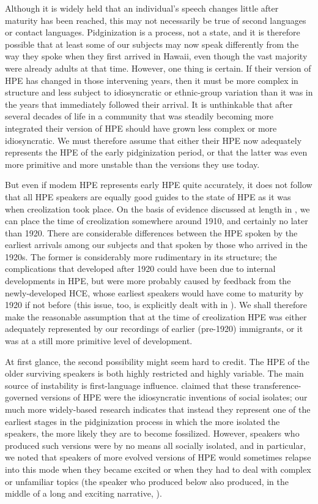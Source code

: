 Although it is widely held that an individual's speech changes little after maturity has been reached, this may not necessarily be true of second languages or contact languages. Pidginization is a process, not a state, and it is therefore possible that at least some of our subjects may now speak differently from the way they spoke when they first arrived in Hawaii, even though the vast majority were already adults at that time. However, one thing is certain. If their version of HPE has changed in those intervening years, then it must be more complex in structure and less subject to idiosyncratic or ethnic-group variation than it was in the years that immediately followed their arrival. It is unthinkable that after several decades of life in a community that was steadily becoming more integrated their version of HPE should have grown less complex or more idiosyncratic. We must therefore assume that either their HPE now adequately represents the HPE of the early pidginization period, or that the latter was even more primitive and more unstable than the versions they use today.

But even if modem HPE represents early HPE quite accurately, it does not follow that all HPE speakers are equally good guides to the state of HPE as it was when creolization took place. On the basis of evidence discussed at length in \citet{Bickerton1977}, we can place the time of creolization somewhere around 1910, and certainly no later than 1920. There are considerable differences between the HPE spoken by
the earliest arrivals among our subjects and that spoken by those who arrived in the 1920s. The former is considerably more rudimentary in its structure; the complications that developed after 1920 could have been due to internal developments in HPE, but were more probably caused by feedback from the newly-developed HCE, whose earliest speakers would have come to maturity by 1920 if not before (this issue, too, is explicitly dealt with in \citealt[Chapter~4]{Bickerton1977}). We shall therefore make the reasonable assumption that at the time of creolization HPE was either adequately represented by our recordings of earlier (pre-1920) immigrants, or it was at a still more primitive level of development.

At first glance, the second possibility might seem hard to credit. The HPE of the older surviving speakers is both highly restricted and highly variable. The main source of instability is first-language influence. \citet{Labov1971} claimed that these transference-governed versions of HPE were the idiosyncratic inventions of social isolates; our much more widely-based research indicates that instead they represent one of the earliest stages in the pidginization process in which the more isolated the speakers, the more likely they are to become fossilized. However, speakers who produced such versions were by no means all socially isolated, and in particular, we noted that speakers of more evolved versions of HPE would sometimes relapse into this mode when they became excited or when they had to deal with complex or unfamiliar topics (the speaker who produced  below also produced, in the middle of a long and exciting narrative, ).


